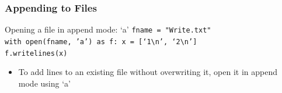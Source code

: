 \documentclass{beamer}
\newcommand{\code}[1]{\texttt{#1}}
\newcommand{\tab}{\hspace*{22pt}}
\begin{document}
\begin{frame}	
\end{frame}

\begin{frame}	
	\frametitle{Appending to Files}
	
	\begin{block}{Opening a file in append mode: `a'}
			\code{fname = "Write.txt" \\
					with open(fname, 'a') as f:
					\tab x = [`1\textbackslash n', `2\textbackslash n'] \\
					\tab f.writelines(x)
			}
		\endminipage\hfill
			\begin{itemize}
				\item To add lines to an existing file without overwriting it, open it in append mode using `a'
			\end{itemize}
		\endminipage\hfill
	\end{block}
	
\end{frame}
\end{document}
